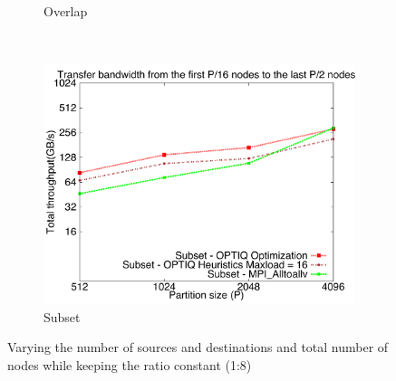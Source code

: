 \begin{figure}[!htbp]
\begin{subfigure}[b]{0.32\textwidth}
                \caption{Overlap}
                \label{fig:constantr_27}
        \end{subfigure}
        ~ %
        \begin{subfigure}[b]{0.32\textwidth}
                \includegraphics[width=\textwidth]{figures/constantr_87}
                \caption{Subset}
                \label{fig:constantr_87}
        \end{subfigure}
        \caption{Varying the number of sources and destinations and total number of nodes while keeping the ratio constant (1:8) }
        \label{fig:constantr}
\end{figure}

